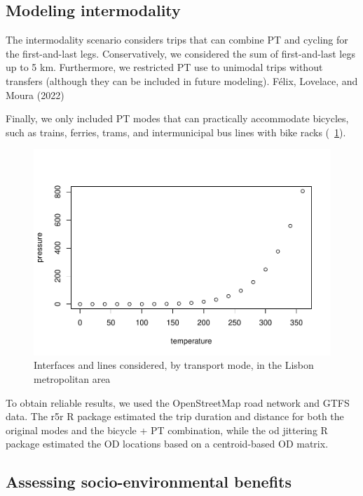 \documentclass[runningheads]{llncs}
\begin{document}
\hypertarget{modeling-intermodality}{%
\subsection{Modeling intermodality}\label{modeling-intermodality}}

The intermodality scenario considers trips that can combine PT and
cycling for the first-and-last legs. Conservatively, we considered the
sum of first-and-last legs up to 5 km. Furthermore, we restricted PT use
to unimodal trips without transfers (although they can be included in
future modeling). Félix, Lovelace, and Moura (2022)

Finally, we only included PT modes that can practically accommodate
bicycles, such as trains, ferries, trams, and intermunicipal bus lines
with bike racks (~\ref{fig:map1}).

\begin{figure}
\includegraphics{PaperTRA_files/figure-latex/map1-1} \caption{Interfaces and lines considered, by transport mode, in the Lisbon metropolitan area}\label{fig:map1}
\end{figure}

To obtain reliable results, we used the OpenStreetMap road network and
GTFS data. The r5r R package estimated the trip duration and distance
for both the original modes and the bicycle + PT combination, while the
od jittering R package estimated the OD locations based on a
centroid-based OD matrix.

\hypertarget{assessing-socio-environmental-benefits}{%
\subsection{Assessing socio-environmental
benefits}\label{assessing-socio-environmental-benefits}}
\end{document}
